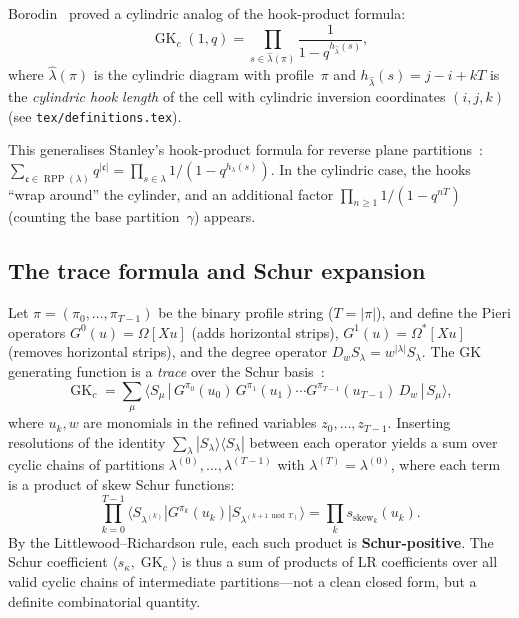 \documentclass[11pt]{article}
\theoremstyle{plain}
\theoremstyle{definition}
\theoremstyle{remark}
\newcommand{\RPP}{\operatorname{RPP}}
\newcommand{\GK}{\operatorname{GK}}
\begin{document}
Borodin~\cite{borodin-2007} proved a cylindric analog of the
hook-product formula:
\begin{equation}\label{eq:borodin}
  \GK_c(1,q) = \prod_{s \in \widehat{\lambda}(\pi)} \frac{1}{1 - q^{h_{\widehat{\lambda}}(s)}},
\end{equation}
where $\widehat{\lambda}(\pi)$ is the cylindric diagram with
profile~$\pi$ and $h_{\widehat{\lambda}}(s) = j - i + kT$ is the
\emph{cylindric hook length} of the cell with cylindric inversion
coordinates $(i,j,k)$ (see \texttt{tex/definitions.tex}).

This generalises Stanley's hook-product formula for reverse plane
partitions~\cite{stanley-1972}:
$\sum_{\mathfrak{c} \in \RPP(\lambda)} q^{|\mathfrak{c}|}
= \prod_{s \in \lambda} 1/(1 - q^{h_\lambda(s)})$.
In the cylindric case, the hooks ``wrap around'' the cylinder,
and an additional factor $\prod_{n \geq 1} 1/(1 - q^{nT})$
(counting the base partition~$\gamma$) appears.

\subsection{The trace formula and Schur expansion}
\label{sec:trace}

Let $\pi = (\pi_0, \ldots, \pi_{T-1})$ be the binary profile string
($T = |\pi|$), and define the Pieri operators
$G^0(u) = \Omega[Xu]$ (adds horizontal strips),
$G^1(u) = \Omega^*[Xu]$ (removes horizontal strips),
and the degree operator $D_w S_\lambda = w^{|\lambda|} S_\lambda$.
The GK generating function is a \emph{trace} over the Schur
basis~\cite{langer-thesis}:
\begin{equation}\label{eq:trace}
  \GK_c = \sum_\mu \langle S_\mu \,|\,
  G^{\pi_0}(u_0)\, G^{\pi_1}(u_1) \cdots G^{\pi_{T-1}}(u_{T-1})\,
  D_w \,|\, S_\mu \rangle,
\end{equation}
where $u_k, w$ are monomials in the refined variables
$z_0, \ldots, z_{T-1}$.
Inserting resolutions of the identity $\sum_\lambda
|S_\lambda\rangle \langle S_\lambda|$ between each operator
yields a sum over cyclic chains of partitions
$\lambda^{(0)}, \ldots, \lambda^{(T-1)}$ with
$\lambda^{(T)} = \lambda^{(0)}$, where each term is a product
of skew Schur functions:
\[
  \prod_{k=0}^{T-1}
  \langle S_{\lambda^{(k)}} | G^{\pi_k}(u_k) |
  S_{\lambda^{(k+1 \bmod T)}} \rangle
  = \prod_k s_{\text{skew}_k}(u_k).
\]
By the Littlewood--Richardson rule, each such product is
\textbf{Schur-positive}. The Schur coefficient
$\langle s_\kappa, \GK_c \rangle$ is thus a sum of
products of LR coefficients over all valid cyclic chains
of intermediate partitions---not a clean closed form,
but a definite combinatorial quantity.
\end{document}
